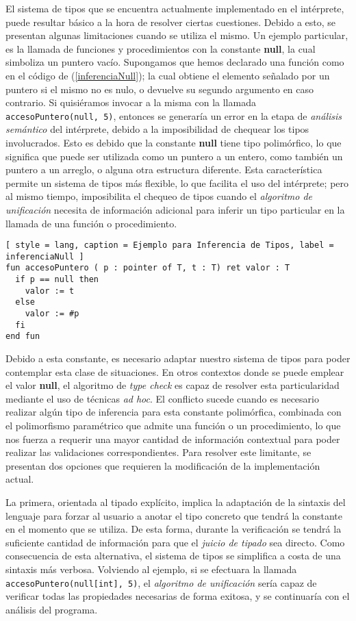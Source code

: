 El sistema de tipos que se encuentra actualmente implementado en el intérprete, puede resultar básico a la hora de resolver ciertas cuestiones.
Debido a esto, se presentan algunas limitaciones cuando se utiliza el mismo.
Un ejemplo particular, es la llamada de funciones y procedimientos con la constante \textbf{null}, la cual simboliza un puntero vacío.
Supongamos que hemos declarado una función como en el código de (\ref{inferenciaNull}); la cual obtiene el elemento señalado por un puntero si el mismo no es nulo, o devuelve su segundo argumento en caso contrario.
Si quisiéramos invocar a la misma con la llamada \lstinline[style = lang]{accesoPuntero(null, 5)}, entonces se generaría un error en la etapa de \textit{análisis semántico} del intérprete, debido a la imposibilidad de chequear los tipos involucrados.
Esto es debido que la constante \textbf{null} tiene tipo polimórfico, lo que significa que puede ser utilizada como un puntero a un entero, como también un puntero a un arreglo, o alguna otra estructura diferente.
Esta característica permite un sistema de tipos más flexible, lo que facilita el uso del intérprete; pero al mismo tiempo, imposibilita el chequeo de tipos cuando el \textit{algoritmo de unificación} necesita de información adicional para inferir un tipo particular en la llamada de una función o procedimiento.

\begin{lstlisting}[ style = lang, caption = Ejemplo para Inferencia de Tipos, label = inferenciaNull ]
fun accesoPuntero ( p : pointer of T, t : T) ret valor : T
  if p == null then
    valor := t
  else
    valor := #p
  fi
end fun
\end{lstlisting}

Debido a esta constante, es necesario adaptar nuestro sistema de tipos para poder contemplar esta clase de situaciones.
En otros contextos donde se puede emplear el valor \textbf{null}, el algoritmo de \textit{type check} es capaz de resolver esta particularidad mediante el uso de técnicas \textit{ad hoc}.
El conflicto sucede cuando es necesario realizar algún tipo de inferencia para esta constante polimórfica, combinada con el polimorfismo paramétrico que admite una función o un procedimiento, lo que nos fuerza a requerir una mayor cantidad de información contextual para poder realizar las validaciones correspondientes.
Para resolver este limitante, se presentan dos opciones que requieren la modificación de la implementación actual.

La primera, orientada al tipado explícito, implica la adaptación de la sintaxis del lenguaje para forzar al usuario a anotar el tipo concreto que tendrá la constante en el momento que se utiliza.
De esta forma, durante la verificación se tendrá la suficiente cantidad de información para que el \textit{juicio de tipado} sea directo.
Como consecuencia de esta alternativa, el sistema de tipos se simplifica a costa de una sintaxis más verbosa.
Volviendo al ejemplo, si se efectuara la llamada \lstinline[style = lang]{accesoPuntero(null[int], 5)}, el \textit{algoritmo de unificación} sería capaz de verificar todas las propiedades necesarias de forma exitosa, y se continuaría con el análisis del programa.

